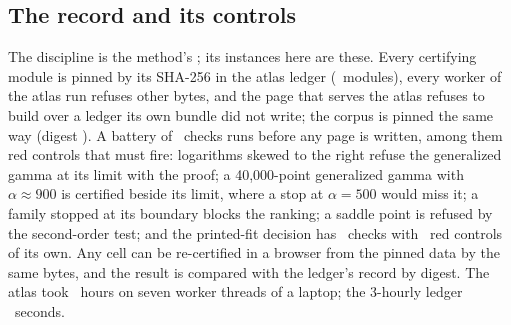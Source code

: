 \documentclass[preprint,11pt,authoryear]{elsarticle}
\begin{document}
\subsection{The record and its controls}\label{sec:controls}
The discipline is the method's \citep[\S5]{certmethod}; its instances here are these. Every certifying module is pinned by its SHA-256 in the atlas ledger (\ACodeModules\ modules), every worker of the atlas run refuses other bytes, and the page that serves the atlas refuses to build over a ledger its own bundle did not write; the corpus is pinned the same way (digest \ACorpusSha). A battery of \HsevaChecks\ checks runs before any page is written, among them red controls that must fire: logarithms skewed to the right refuse the generalized gamma at its limit with the proof; a 40,000-point generalized gamma with $\alpha \approx 900$ is certified beside its limit, where a stop at $\alpha = 500$ would miss it; a family stopped at its boundary blocks the ranking; a saddle point is refused by the second-order test; and the printed-fit decision has \PrintedChecks\ checks with \PrintedReds\ red controls of its own. Any cell can be re-certified in a browser from the pinned data by the same bytes, and the result is compared with the ledger's record by digest. The atlas took \ASecondsHours\ hours on seven worker threads of a laptop; the 3-hourly ledger \RSeconds\ seconds.
\end{document}
